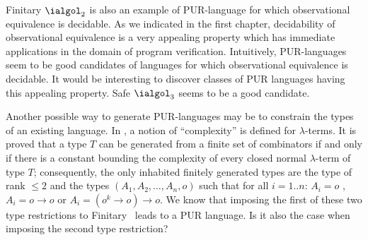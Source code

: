 Finitary $\ialgol_2$ is also an example of PUR-language for which
observational equivalence is decidable. As we indicated in the first
chapter, decidability of observational equivalence is a very
appealing property which has immediate applications in the domain of
program verification. Intuitively, PUR-languages seem to be good
candidates of languages for which observational equivalence is decidable. It would be interesting to discover classes of PUR
languages having this appealing property. Safe $\ialgol_3$ seems to be a good candidate.

Another possible way to generate PUR-languages may be to constrain
the types of an existing language. In \cite{DBLP:conf/tlca/Joly01},
a notion of ``complexity'' is defined for $\lambda$-terms. It is
proved that a type $T$ can be generated from a finite set of
combinators if and only if there is a constant bounding the
complexity of every closed normal $\lambda$-term of type $T$;
consequently, the only inhabited finitely generated types are the
type of rank $\leq 2$ and the types $(A_1, A_2, \ldots, A_n, o)$
such that for all $i = 1..n$: $A_i = o$ , $A_i = o \rightarrow o$ or
$A_i = (o^k \rightarrow o) \rightarrow o$. We know that imposing the
first of these two type restrictions to Finitary \ialgol\ leads to a
PUR language. Is it also the case when imposing the second type
restriction?



    
    

         {\protect{}}


\bigsqcup%
